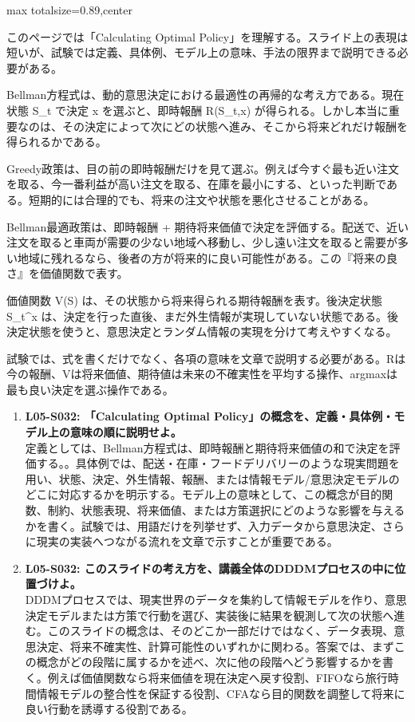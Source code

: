 \begin{minipage}[t]{0.58\textwidth}
\begin{adjustbox}{max totalsize={\textwidth}{0.89\textheight},center}
\begin{minipage}{\textwidth}\scriptsize
{}このページでは「Calculating Optimal Policy」を理解する。スライド上の表現は短いが、試験では定義、具体例、モデル上の意味、手法の限界まで説明できる必要がある。\par
Bellman方程式は、動的意思決定における最適性の再帰的な考え方である。現在状態 S\_t で決定 x を選ぶと、即時報酬 R(S\_t,x) が得られる。しかし本当に重要なのは、その決定によって次にどの状態へ進み、そこから将来どれだけ報酬を得られるかである。\par
Greedy政策は、目の前の即時報酬だけを見て選ぶ。例えば今すぐ最も近い注文を取る、今一番利益が高い注文を取る、在庫を最小にする、といった判断である。短期的には合理的でも、将来の注文や状態を悪化させることがある。\par
Bellman最適政策は、即時報酬 + 期待将来価値で決定を評価する。配送で、近い注文を取ると車両が需要の少ない地域へ移動し、少し遠い注文を取ると需要が多い地域に残れるなら、後者の方が将来的に良い可能性がある。この『将来の良さ』を価値関数で表す。\par
価値関数 V(S) は、その状態から将来得られる期待報酬を表す。後決定状態 S\_t\textasciicircum{}x は、決定を行った直後、まだ外生情報が実現していない状態である。後決定状態を使うと、意思決定とランダム情報の実現を分けて考えやすくなる。\par
試験では、式を書くだけでなく、各項の意味を文章で説明する必要がある。Rは今の報酬、Vは将来価値、期待値は未来の不確実性を平均する操作、argmaxは最も良い決定を選ぶ操作である。\par{}\begin{enumerate}\item \textbf{L05-S032: 「Calculating Optimal Policy」の概念を、定義・具体例・モデル上の意味の順に説明せよ。}\\定義としては、Bellman方程式は、即時報酬と期待将来価値の和で決定を評価する。。具体例では、配送・在庫・フードデリバリーのような現実問題を用い、状態、決定、外生情報、報酬、または情報モデル/意思決定モデルのどこに対応するかを明示する。モデル上の意味として、この概念が目的関数、制約、状態表現、将来価値、または方策選択にどのような影響を与えるかを書く。試験では、用語だけを列挙せず、入力データから意思決定、さらに現実の実装へつながる流れを文章で示すことが重要である。\item \textbf{L05-S032: このスライドの考え方を、講義全体のDDDMプロセスの中に位置づけよ。}\\DDDMプロセスでは、現実世界のデータを集約して情報モデルを作り、意思決定モデルまたは方策で行動を選び、実装後に結果を観測して次の状態へ進む。このスライドの概念は、そのどこか一部だけではなく、データ表現、意思決定、将来不確実性、計算可能性のいずれかに関わる。答案では、まずこの概念がどの段階に属するかを述べ、次に他の段階へどう影響するかを書く。例えば価値関数なら将来価値を現在決定へ戻す役割、FIFOなら旅行時間情報モデルの整合性を保証する役割、CFAなら目的関数を調整して将来に良い行動を誘導する役割である。\end{enumerate}

\end{minipage}
\end{adjustbox}
\end{minipage}
